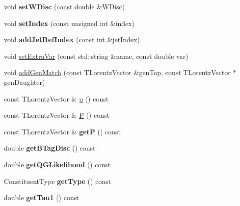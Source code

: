 \begin{DoxyCompactItemize}
\item 
\hypertarget{classConstituent_a48d0d129c41154c3dcaa51ff3e5c44c3}{void {\bfseries set\-W\-Disc} (const double \&W\-Disc)}\label{classConstituent_a48d0d129c41154c3dcaa51ff3e5c44c3}

\item 
\hypertarget{classConstituent_abc67caff918e263ec1e58372efa4641b}{void {\bfseries set\-Index} (const unsigned int \&index)}\label{classConstituent_abc67caff918e263ec1e58372efa4641b}

\item 
\hypertarget{classConstituent_a663d519cdaf8688be9f51152b9058c7e}{void {\bfseries add\-Jet\-Ref\-Index} (const int \&jet\-Index)}\label{classConstituent_a663d519cdaf8688be9f51152b9058c7e}

\item 
void \hyperlink{classConstituent_a1b2fc086bc359e141e54ed2903c951c9}{set\-Extra\-Var} (const std\-::string \&name, const double var)
\item 
void \hyperlink{classConstituent_a2aea6bdc5229bb87227bcc8caa9c51c6}{add\-Gen\-Match} (const T\-Lorentz\-Vector \&gen\-Top, const T\-Lorentz\-Vector $\ast$gen\-Daughter)
\item 
const T\-Lorentz\-Vector \& \hyperlink{classConstituent_a3f918f1210cc666288327544e32d728c}{p} () const 
\item 
const T\-Lorentz\-Vector \& \hyperlink{classConstituent_a9f95db0ef9ae97fa0dc2cf45153e4131}{P} () const 
\item 
\hypertarget{classConstituent_ac4954793667cf0b2ffd136fbd8df0cda}{const T\-Lorentz\-Vector \& {\bfseries get\-P} () const }\label{classConstituent_ac4954793667cf0b2ffd136fbd8df0cda}

\item 
\hypertarget{classConstituent_af2cbdf02c47682a97db91a724a4ae3e1}{double {\bfseries get\-B\-Tag\-Disc} () const }\label{classConstituent_af2cbdf02c47682a97db91a724a4ae3e1}

\item 
\hypertarget{classConstituent_ae58e807a0bd4adfff6c052882f2f9396}{double {\bfseries get\-Q\-G\-Likelihood} () const }\label{classConstituent_ae58e807a0bd4adfff6c052882f2f9396}

\item 
\hypertarget{classConstituent_a325cb683912acb64e2fcbde14726f6a6}{Constituent\-Type {\bfseries get\-Type} () const }\label{classConstituent_a325cb683912acb64e2fcbde14726f6a6}

\item 
\hypertarget{classConstituent_a2c057eb66cfeed68e5bd58e1c5815e8b}{double {\bfseries get\-Tau1} () const }\label{classConstituent_a2c057eb66cfeed68e5bd58e1c5815e8b}


\end{DoxyCompactItemize}
